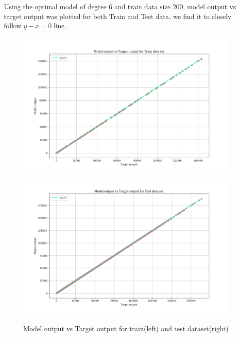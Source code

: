 \documentclass[12pt,a4paper]{article}
\begin{document}
Using the optimal model of degree 6 and train data size 200, model output vs target output was plotted for both Train and Test data, we find it to closely follow $y-x=0$ line.
\begin{figure}[H]
    \centering
    \includegraphics[scale=0.45]{images/tvsy_train.png}
    \includegraphics[scale=0.45]{images/tvsy_test.png}
    \caption{Model output vs Target output for train(left) and test dataset(right)}
    \label{fig:yvst}
\end{figure}

\break
\end{document}
